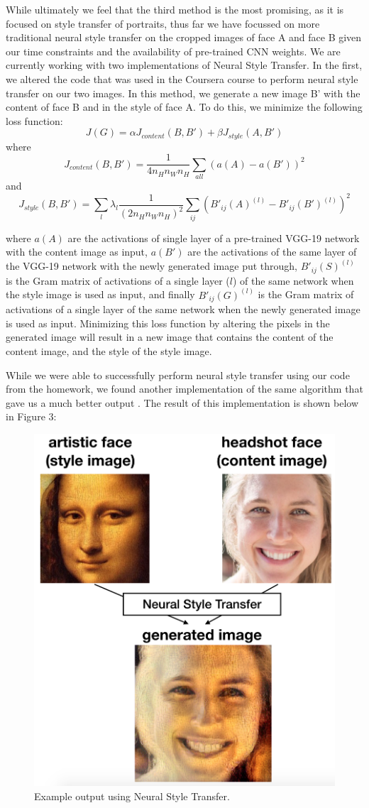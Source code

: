 \documentclass{pnastwo2}
\begin{document}
\begin{article}
While ultimately we feel that the third method is the most promising, as it is focused on style transfer of portraits, thus far we have focussed on more traditional neural style transfer on the cropped images of face A and face B given our time constraints and the availability of pre-trained CNN weights. We are currently working with two implementations of Neural Style Transfer. In the first, we altered the code that was used in the Coursera course to perform neural style transfer on our two images. In this method, we generate a new image B' with the content of face B and in the style of face A. To do this, we minimize the following loss function:
\[
J(G)=\alpha J_{content}(B,B')+\beta J_{style}(A,B')
\]
where
\[
 J_{content}(B,B') = \frac{1}{4n_Hn_Wn_H} \sum_{all} (a(A) - a(B'))^2
\]
and 
\[
 J_{style}(B,B') = \sum_l  \lambda_l \frac{1}{(2n_Hn_Wn_H)^2} \sum_{ij} (B'_{ij}(A)^{(l)} - B'_{ij}(B')^{(l)})^2
\]

where $a(A)$ are the activations of single layer of a pre-trained VGG-19 network with the content image as input, $a(B')$ are the activations of the same layer of the VGG-19 network with the newly generated image put through, $B'_{ij}(S)^{(l)}$ is the Gram matrix of activations of a single layer ($l$) of the same network when the style image is used as input, and finally $B'_{ij}(G)^{(l)}$ is the Gram matrix of activations of a single layer of the same network when the newly generated image is used as input. Minimizing this loss function by altering the pixels in the generated image will result in a new image that contains the content of the content image, and the style of the style image. 

While we were able to successfully perform neural style transfer using our code from the homework, we found another implementation of the same algorithm that gave us a much better output \cite{NeuralStyleTranferGithub}. The result of this implementation is shown below in Figure 3:

\begin{figure}[ht]
	\begin{center}
		\includegraphics[width=.4\textwidth]{neural_style_transfer_output_v2}
		\caption{Example output using Neural Style Transfer.} \label{fig:nst}
	\end{center}
\end{figure} 


\end{article}
\end{document}
